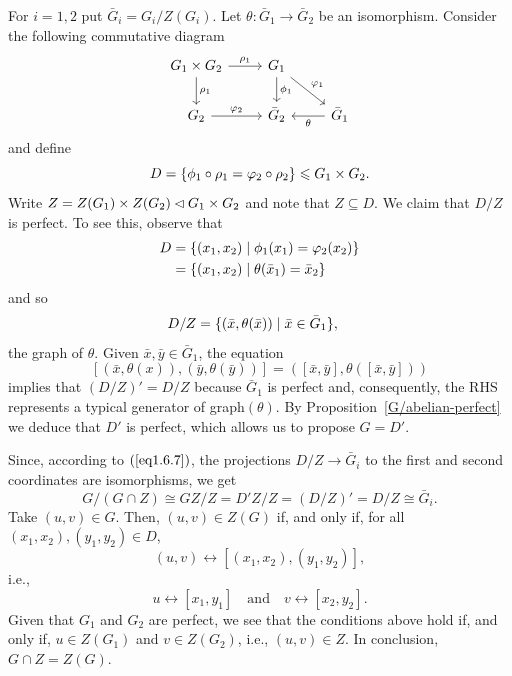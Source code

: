 \begin{solution}
    For $i=1,2$ put $\bar G_i=G_i/Z(G_i)$. Let $\theta\colon\bar G_1\to\bar G_2$ be an isomorphism. Consider the following commutative diagram
    $$
        \begin{tikzcd}
            G_1\times G_2\arrow[d,"\rho_1"]\arrow[r,"\rho_1"]
                &G_1\arrow[rd,"\varphi_1"]\arrow[d,"\phi_1"]\\
            G_2\arrow[r,"\varphi_2"]
                &\bar G_2
                &\bar G_1\arrow[l,"\theta"]
        \end{tikzcd}
    $$
    and define
    $$
        D = \{\phi_1\circ\rho_1=\varphi_2\circ\rho_2\}\leqslant G_1\times G_2.
    $$
    Write $Z=Z(G_1)\times Z(G_2)\lhd G_1\times G_2$ and note that $Z\subseteq D$. We claim that $D/Z$ is perfect. To see this, observe that
    \begin{align*}
        D &= \{(x_1,x_2)\mid \phi_1(x_1)=\varphi_2(x_2)\}\\
            &= \{(x_1,x_2)\mid \theta(\bar x_1)=\bar x_2\}
    \end{align*}
    and so
    \begin{align}\label{eq1.6.7}
        D/Z &= \{(\bar x,\theta(\bar x))\mid\bar x\in\bar G_1\},
    \end{align}
    the graph of $\theta$. Given $\bar x,\bar y\in\bar G_1$, the equation
    $$
        [(\bar x,\theta(x)),(\bar y,\theta(\bar y))]
            = ([\bar x,\bar y],\theta([\bar x,\bar y]))
    $$
    implies that $(D/Z)'=D/Z$ because $\bar G_1$ is perfect and, consequently, the RHS represents a typical generator of graph$(\theta)$. By Proposition~\ref{G/abelian-perfect} we deduce that $D'$ is perfect, which allows us to propose $G=D'$.
    
    Since, according to $(\ref{eq1.6.7})$, the projections $D/Z\to\bar G_i$ to the first and second coordinates are isomorphisms, we get
    $$
        G/(G\cap Z) \cong GZ/Z = D'Z/Z = (D/Z)' = D/Z \cong \bar G_i.
    $$
    Take $(u,v)\in G$. Then, $(u,v)\in Z(G)$ if, and only if, for all $(x_1,x_2),(y_1,y_2)\in D$,
    $$
        (u,v)\leftrightarrow[(x_1,x_2),(y_1,y_2)],
    $$
    i.e.,
    $$
        u\leftrightarrow[x_1,y_1]\quad\text{and}\quad
            v\leftrightarrow[x_2,y_2].
    $$
    Given that $G_1$ and $G_2$ are perfect, we see that the conditions above hold if, and only if, $u\in Z(G_1)$ and $v\in Z(G_2)$, i.e., $(u,v)\in Z$. In conclusion, $G\cap Z=Z(G)$.
    

\end{solution}
